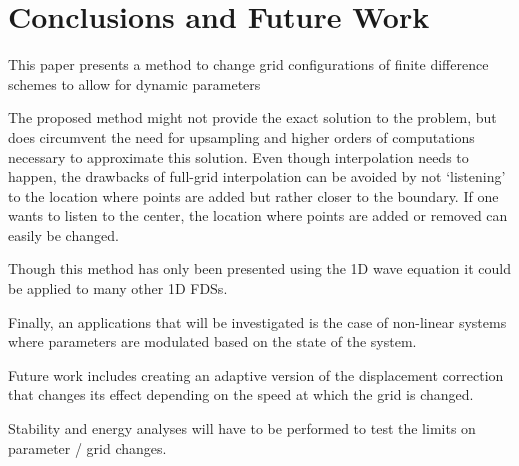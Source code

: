 \section{Conclusions and Future Work}\label{sec:conclusion}
This paper presents a method to change grid configurations of finite difference schemes to allow for dynamic parameters


The proposed method might not provide the exact solution to the problem, but does circumvent the need for upsampling and higher orders of computations necessary to approximate this solution. Even though interpolation needs to happen, the drawbacks of full-grid interpolation can be avoided by not `listening' to the location where points are added but rather closer to the boundary. If one wants to listen to the center, the location where points are added or removed can easily be changed.

Though this method has only been presented using the 1D wave equation it could be applied to many other 1D FDSs. 


Finally, an applications that will be investigated is the case of non-linear systems where parameters are modulated based on the state of the system. 


Future work includes creating an adaptive version of the displacement correction that changes its effect depending on the speed at which the grid is changed.

Stability and energy analyses will have to be performed to test the limits on parameter / grid changes.
